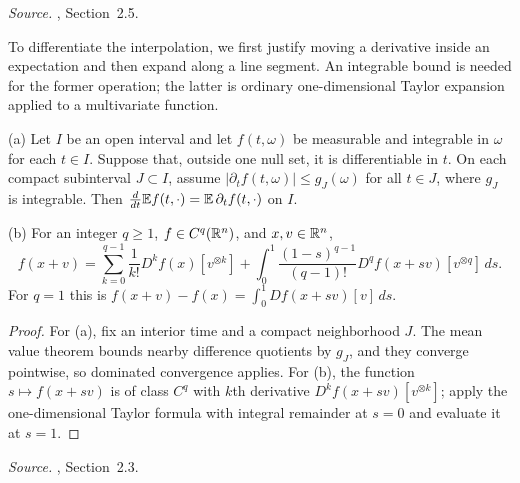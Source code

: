 \emph{Source.} , Section~2.5.

To differentiate the interpolation, we first justify moving a derivative
inside an expectation and then expand along a line segment. An integrable
bound is needed for the former operation; the latter is ordinary
one-dimensional Taylor expansion applied to a multivariate function.

\begin{fact}
\label{tb:taylor}
(a) Let \(I\) be an open interval and let \(f(t,\omega)\) be
measurable and integrable in \(\omega\) for each \(t\in I\).
Suppose that, outside one null set, it is differentiable in \(t\).
On each compact subinterval \(J\subset I\), assume
\(|\partial_t f(t,\omega)|\le g_J(\omega)\) for all \(t\in J\),
where \(g_J\) is integrable. Then \(\frac d{dt}\mathbb E f(t,\cdot)
=\mathbb E\,\partial_t f(t,\cdot)\) on \(I\).

(b) For an integer \(q\ge1\), \(f\in C^q(\mathbb R^n)\), and \(x,v\in\mathbb R^n\),
\[
 f(x+v)=\sum_{k=0}^{q-1}\frac1{k!}D^kf(x)[v^{\otimes k}]
 +\int_0^1\frac{(1-s)^{q-1}}{(q-1)!}D^qf(x+sv)[v^{\otimes q}]\,ds.
\]
For \(q=1\) this is \(f(x+v)-f(x)=\int_0^1Df(x+sv)[v]\,ds\).
\end{fact}

\begin{proof}
For (a), fix an interior time and a compact neighborhood \(J\).
The mean value theorem bounds nearby difference quotients by \(g_J\),
and they converge pointwise, so dominated convergence applies. For (b),
the function \(s\mapsto f(x+sv)\) is of class \(C^q\) with \(k\)th derivative
\(D^kf(x+sv)[v^{\otimes k}]\); apply the one-dimensional Taylor formula with
integral remainder at \(s=0\) and evaluate it at \(s=1\).
\end{proof}

\emph{Source.} , Section~2.3.

